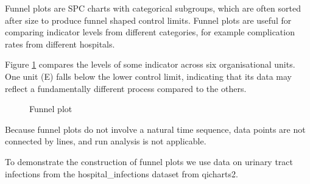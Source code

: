 \documentclass[
]{book}
\makeatletter
\newenvironment{Shaded}{\begin{snugshade}}{\end{snugshade}}
\newcommand{\AttributeTok}[1]{\textcolor[rgb]{0.13,0.29,0.53}{#1}}
\newcommand{\CommentTok}[1]{\textcolor[rgb]{0.56,0.35,0.01}{\textit{#1}}}
\newcommand{\DecValTok}[1]{\textcolor[rgb]{0.00,0.00,0.81}{#1}}
\newcommand{\FunctionTok}[1]{\textcolor[rgb]{0.13,0.29,0.53}{\textbf{#1}}}
\newcommand{\NormalTok}[1]{#1}
\newcommand{\OtherTok}[1]{\textcolor[rgb]{0.56,0.35,0.01}{#1}}
\newcommand{\SpecialCharTok}[1]{\textcolor[rgb]{0.81,0.36,0.00}{\textbf{#1}}}
\newcommand{\StringTok}[1]{\textcolor[rgb]{0.31,0.60,0.02}{#1}}
\newcommand*\pandocbounded[1]{%
  \sbox\pandoc@box{#1}%
  \Gscale@div\@tempa{\textheight}{\dimexpr\ht\pandoc@box+\dp\pandoc@box\relax}%
  \Gscale@div\@tempb{\linewidth}{\wd\pandoc@box}%
  \ifdim\@tempb\p@<\@tempa\p@\let\@tempa\@tempb\fi%
  \ifdim\@tempa\p@<\p@\scalebox{\@tempa}{\usebox\pandoc@box}%
  \else\usebox{\pandoc@box}%
  \fi%
}
\makeatother
\begin{document}
Funnel plots are SPC charts with categorical subgroups, which are often sorted after size to produce funnel shaped control limits. Funnel plots are useful for comparing indicator levels from different categories, for example complication rates from different hospitals.

Figure \ref{fig:funnel-fig0} compares the levels of some indicator across six organisational units. One unit (E) falls below the lower control limit, indicating that its data may reflect a fundamentally different process compared to the others.

\begin{figure}
\centering
\pandocbounded{}
\caption{\label{fig:funnel-fig0}Funnel plot}
\end{figure}

Because funnel plots do not involve a natural time sequence, data points are not connected by lines, and run analysis is not applicable.

To demonstrate the construction of funnel plots we use data on urinary tract infections from the hospital\_infections dataset from qicharts2.

\begin{Shaded}
\end{Shaded}
\end{document}
